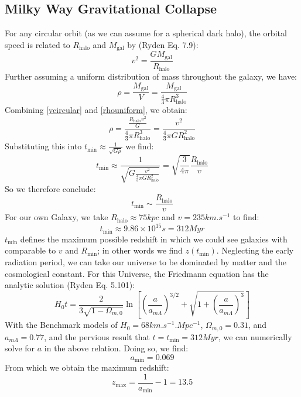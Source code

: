 \subsection{Milky Way Gravitational Collapse}
For any circular orbit (as we can assume for a spherical dark halo), the orbital speed is related to $R_{\text{halo}}$ and $M_{\text{gal}}$ by (Ryden Eq. 7.9):
\begin{equation}\label{vcircular}
    v^2 = \frac{GM_{\text{gal}}}{R_{\text{halo}}}
\end{equation}
Further assuming a uniform distribution of mass throughout the galaxy, we have:
\begin{equation}\label{rhouniform}
    \rho = \frac{M_{\text{gal}}}{V} = \frac{M_{\text{gal}}}{\frac{4}{3}\pi R_{\text{halo}}^3}
\end{equation}
Combining \eqref{vcircular} and \eqref{rhouniform}, we obtain:
\begin{equation}
    \rho = \frac{\frac{R_{\text{halo}} v^2}{G}}{\frac{4}{3}\pi R_{\text{halo}}^3} = \frac{v^2}{\frac{4}{3}\pi G R_{\text{halo}}^2}
\end{equation}
Substituting this into $t_{\text{min}} \approx \frac{1}{\sqrt{G\rho}}$ we find:
\begin{equation}
    t_{\text{min}} \approx \frac{1}{\sqrt{G\frac{v^2}{\frac{4}{3}\pi G R_{\text{halo}}^2}}} = \sqrt{\frac{3}{4\pi}}\frac{R_{\text{halo}}}{v}
\end{equation}
So we therefore conclude:
\begin{equation}
    \boxed{t_{\text{min}} \sim \frac{R_{\text{halo}}}{v}}
\end{equation}
For our own Galaxy, we take $R_{\text{halo}} \approx 75\si{kpc}$ and $v = 235\si{km.s^{-1}}$ to find:
\begin{equation}
    \boxed{t_{\text{min}} \approx 9.86 \times 10^{15}\si{s} = 312\si{Myr}}
\end{equation}
$t_{\text{min}}$ defines the maximum possible redshift in which we could see galaxies with comparable to $v$ and $R_{\text{min}}$; in other words we find $z(t_{\text{min}})$. Neglecting the early radiation period, we can take our universe to be dominated by matter and the cosmological constant. For this Universe, the Friedmann equation has the analytic solution (Ryden Eq. 5.101):
\begin{equation}
    H_0 t = \frac{2}{3\sqrt{1 - \Omega_{m, 0}}}\ln\left[\left(\frac{a}{a_{m\Lambda}}\right)^{3/2} + \sqrt{1 + \left(\frac{a}{a_{m\Lambda}}\right)^3}\right]
\end{equation}
With the Benchmark models of $H_0 = 68 \si{km.s^{-1}.Mpc^{-1}}$, $\Omega_{m, 0} = 0.31$, and $a_{m\Lambda} = 0.77$, and the pervious result that $t = t_{\text{min}} = 312\si{Myr}$, we can numerically solve for $a$ in the above relation. Doing so, we find:
\begin{equation}
    a_{\text{min}} = 0.069
\end{equation}
From which we obtain the maximum redshift:
\begin{equation}
    \boxed{z_{\text{max}} = \frac{1}{a_{\text{min}}} - 1 = 13.5}
\end{equation}

